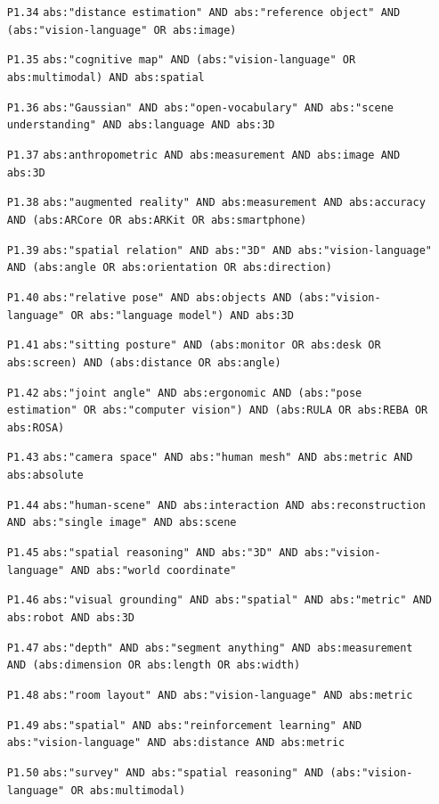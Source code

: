 {\begin{itemize}
\item[\texttt{P1.34}] \texttt{abs:"distance estimation" AND abs:"reference object" AND (abs:"vision-language" OR abs:image)}
\item[\texttt{P1.35}] \texttt{abs:"cognitive map" AND (abs:"vision-language" OR abs:multimodal) AND abs:spatial}
\item[\texttt{P1.36}] \texttt{abs:"Gaussian" AND abs:"open-vocabulary" AND abs:"scene understanding" AND abs:language AND abs:3D}
\item[\texttt{P1.37}] \texttt{abs:anthropometric AND abs:measurement AND abs:image AND abs:3D}
\item[\texttt{P1.38}] \texttt{abs:"augmented reality" AND abs:measurement AND abs:accuracy AND (abs:ARCore OR abs:ARKit OR abs:smartphone)}
\item[\texttt{P1.39}] \texttt{abs:"spatial relation" AND abs:"3D" AND abs:"vision-language" AND (abs:angle OR abs:orientation OR abs:direction)}
\item[\texttt{P1.40}] \texttt{abs:"relative pose" AND abs:objects AND (abs:"vision-language" OR abs:"language model") AND abs:3D}
\item[\texttt{P1.41}] \texttt{abs:"sitting posture" AND (abs:monitor OR abs:desk OR abs:screen) AND (abs:distance OR abs:angle)}
\item[\texttt{P1.42}] \texttt{abs:"joint angle" AND abs:ergonomic AND (abs:"pose estimation" OR abs:"computer vision") AND (abs:RULA OR abs:REBA OR abs:ROSA)}
\item[\texttt{P1.43}] \texttt{abs:"camera space" AND abs:"human mesh" AND abs:metric AND abs:absolute}
\item[\texttt{P1.44}] \texttt{abs:"human-scene" AND abs:interaction AND abs:reconstruction AND abs:"single image" AND abs:scene}
\item[\texttt{P1.45}] \texttt{abs:"spatial reasoning" AND abs:"3D" AND abs:"vision-language" AND abs:"world coordinate"}
\item[\texttt{P1.46}] \texttt{abs:"visual grounding" AND abs:"spatial" AND abs:"metric" AND abs:robot AND abs:3D}
\item[\texttt{P1.47}] \texttt{abs:"depth" AND abs:"segment anything" AND abs:measurement AND (abs:dimension OR abs:length OR abs:width)}
\item[\texttt{P1.48}] \texttt{abs:"room layout" AND abs:"vision-language" AND abs:metric}
\item[\texttt{P1.49}] \texttt{abs:"spatial" AND abs:"reinforcement learning" AND abs:"vision-language" AND abs:distance AND abs:metric}
\item[\texttt{P1.50}] \texttt{abs:"survey" AND abs:"spatial reasoning" AND (abs:"vision-language" OR abs:multimodal)}
\end{itemize}}

